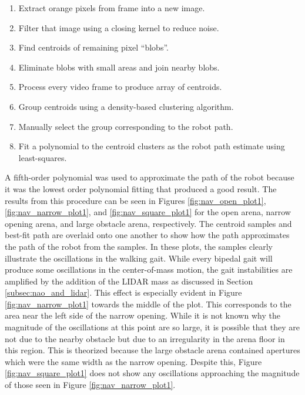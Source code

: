 \begin{enumerate}
  \item Extract orange pixels from frame into a new image.
  \item Filter that image using a closing kernel to reduce noise.
  \item Find centroids of remaining pixel ``blobs''.
  \item Eliminate blobs with small areas and join nearby blobs.
  \item Process every video frame to produce array of centroids.
  \item Group centroids using a density-based clustering algorithm.
  \item Manually select the group corresponding to the robot path.
  \item Fit a polynomial to the centroid clusters as the robot path estimate using least-squares.
\end{enumerate}

A fifth-order polynomial was used to approximate the path of the robot because it was the lowest order polynomial fitting that produced a good result.
The results from this procedure can be seen in Figures \ref{fig:nav_open_plot1},
\ref{fig:nav_narrow_plot1}, and \ref{fig:nav_square_plot1} for the open arena, narrow opening
arena, and large obstacle arena, respectively. The centroid samples and best-fit path are
overlaid onto one another to show how the path approximates the path of the robot from the
samples. In these plots, the samples clearly illustrate the oscillations in the walking gait.
While every bipedal gait will produce some oscillations in the center-of-mass motion,
the gait instabilities are amplified by the addition of the LIDAR mass as discussed in Section
\ref{subsec:nao_and_lidar}. This effect is especially evident in Figure \ref{fig:nav_narrow_plot1}
towards the middle of the plot. This corresponds to the area near the left side of the narrow
opening. While it is not known why the magnitude of the oscillations at this point are so large,
it is possible that they are not due to the nearby obstacle but due to an irregularity in the
arena floor in this region. This is theorized because the large obstacle arena contained apertures
which were the same width as the narrow opening. Despite this, Figure \ref{fig:nav_square_plot1} 
does not show any oscillations approaching the magnitude of those seen in Figure \ref{fig:nav_narrow_plot1}.

